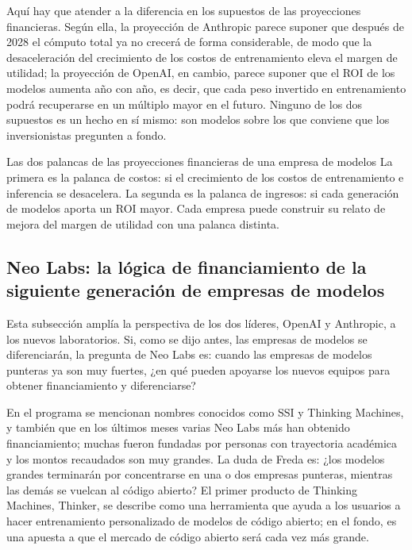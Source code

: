 Aquí hay que atender a la diferencia en los supuestos de las proyecciones financieras. Según ella, la proyección de Anthropic parece suponer que después de 2028 el cómputo total ya no crecerá de forma considerable, de modo que la desaceleración del crecimiento de los costos de entrenamiento eleva el margen de utilidad; la proyección de OpenAI, en cambio, parece suponer que el ROI de los modelos aumenta año con año, es decir, que cada peso invertido en entrenamiento podrá recuperarse en un múltiplo mayor en el futuro. Ninguno de los dos supuestos es un hecho en sí mismo: son modelos sobre los que conviene que los inversionistas pregunten a fondo.

\begin{importantbox}{Las dos palancas de las proyecciones financieras de una empresa de modelos}
La primera es la palanca de costos: si el crecimiento de los costos de entrenamiento e inferencia se desacelera. La segunda es la palanca de ingresos: si cada generación de modelos aporta un ROI mayor. Cada empresa puede construir su relato de mejora del margen de utilidad con una palanca distinta.
\end{importantbox}

\subsection{Neo Labs: la lógica de financiamiento de la siguiente generación de empresas de modelos}

Esta subsección amplía la perspectiva de los dos líderes, OpenAI y Anthropic, a los nuevos laboratorios. Si, como se dijo antes, las empresas de modelos se diferenciarán, la pregunta de Neo Labs es: cuando las empresas de modelos punteras ya son muy fuertes, ¿en qué pueden apoyarse los nuevos equipos para obtener financiamiento y diferenciarse?

En el programa se mencionan nombres conocidos como SSI y Thinking Machines, y también que en los últimos meses varias Neo Labs más han obtenido financiamiento; muchas fueron fundadas por personas con trayectoria académica y los montos recaudados son muy grandes. La duda de Freda es: ¿los modelos grandes terminarán por concentrarse en una o dos empresas punteras, mientras las demás se vuelcan al código abierto? El primer producto de Thinking Machines, Thinker, se describe como una herramienta que ayuda a los usuarios a hacer entrenamiento personalizado de modelos de código abierto; en el fondo, es una apuesta a que el mercado de código abierto será cada vez más grande.

